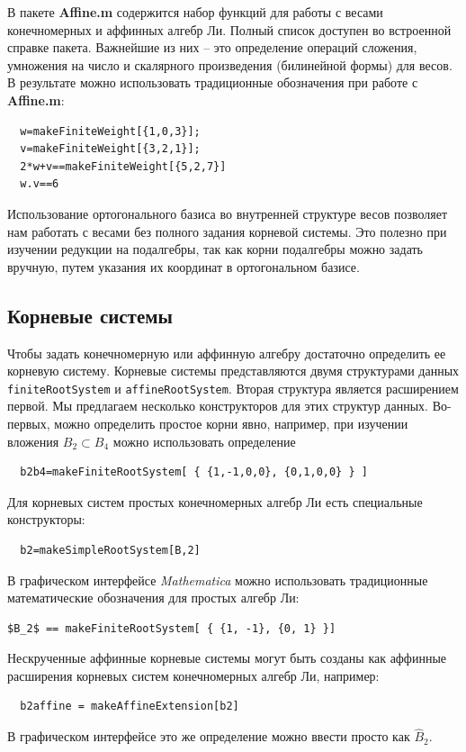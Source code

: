 В пакете {\bf Affine.m} содержится набор функций для работы с весами конечномерных и аффинных алгебр Ли. Полный список доступен во встроенной справке пакета. Важнейшие из них -- это определение операций сложения, умножения на число и скалярного произведения (билинейной формы) для весов. В результате можно использовать традиционные обозначения при работе с  {\bf Affine.m}:
\begin{lstlisting}
  w=makeFiniteWeight[{1,0,3}];
  v=makeFiniteWeight[{3,2,1}];
  2*w+v==makeFiniteWeight[{5,2,7}]
  w.v==6
\end{lstlisting}

Использование ортогонального базиса во внутренней структуре весов позволяет нам работать с весами без полного задания корневой системы. Это полезно при изучении редукции на подалгебры, так как корни подалгебры можно задать вручную, путем указания их координат в ортогональном базисе.

\subsection{Корневые системы}
\label{sec:root-systems}

Чтобы задать конечномерную или аффинную алгебру достаточно определить ее корневую систему. Корневые системы представляются двумя структурами данных \lstinline{finiteRootSystem} и \lstinline{affineRootSystem}. Вторая структура является расширением первой. Мы предлагаем несколько конструкторов для этих структур данных. Во-первых, можно определить простое корни явно, например, при изучении вложения $B_2\subset B_4$ можно использовать определение
\begin{lstlisting}
  b2b4=makeFiniteRootSystem[ { {1,-1,0,0}, {0,1,0,0} } ]
\end{lstlisting}
Для корневых систем простых конечномерных алгебр Ли есть специальные конструкторы:
\begin{lstlisting}
  b2=makeSimpleRootSystem[B,2]
\end{lstlisting}
В графическом интерфейсе {\it Mathematica} можно использовать традиционные математические обозначения для простых алгебр Ли:


\begin{lstlisting}[mathescape=true]
  $B_2$ == makeFiniteRootSystem[ { {1, -1}, {0, 1} }]
\end{lstlisting}

Нескрученные аффинные корневые системы могут быть созданы как аффинные расширения корневых систем конечномерных алгебр Ли, например:
\begin{lstlisting}
  b2affine = makeAffineExtension[b2]
\end{lstlisting}
В графическом интерфейсе это же определение можно ввести просто как $\hat{B}_2$.

